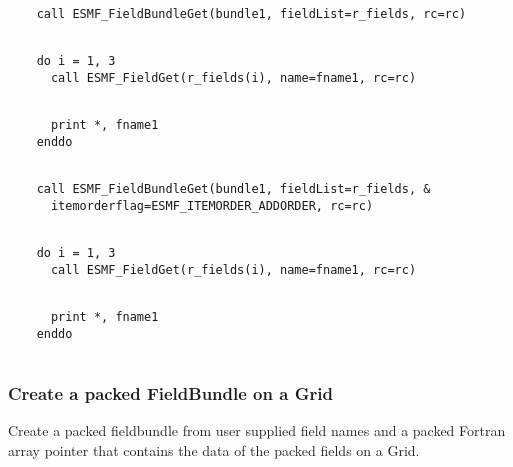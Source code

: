  \begin{verbatim}
    call ESMF_FieldBundleGet(bundle1, fieldList=r_fields, rc=rc)
 
\end{verbatim}
 

 \begin{verbatim}
    do i = 1, 3
      call ESMF_FieldGet(r_fields(i), name=fname1, rc=rc)
 
\end{verbatim}
 

 \begin{verbatim}
      print *, fname1
    enddo
 
\end{verbatim}
 

 \begin{verbatim}
    call ESMF_FieldBundleGet(bundle1, fieldList=r_fields, &
      itemorderflag=ESMF_ITEMORDER_ADDORDER, rc=rc)
 
\end{verbatim}
 

 \begin{verbatim}
    do i = 1, 3
      call ESMF_FieldGet(r_fields(i), name=fname1, rc=rc)
 
\end{verbatim}
 

 \begin{verbatim}
      print *, fname1
    enddo
 
\end{verbatim}
 

   \subsubsection{Create a packed FieldBundle on a Grid}
   \label{sec:fieldbundle:usage:packedFBGrid}
   Create a packed fieldbundle from user supplied 
   field names and a packed Fortran array pointer that contains
   the data of the packed fields on a Grid.  

